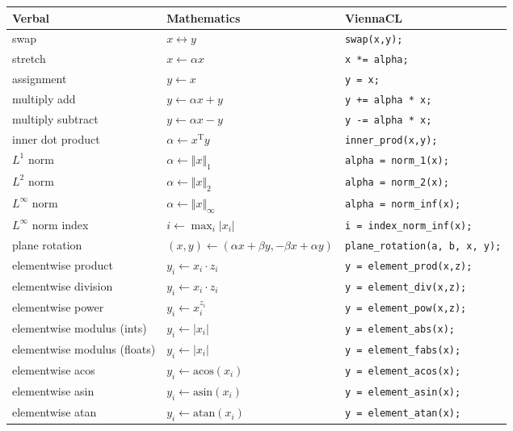 \begin{table}[tb]
\begin{center}
\begin{tabular}{l|l|p{6cm}}
Verbal & Mathematics & ViennaCL\\
\hline
swap    & $x \leftrightarrow y$ & \lstinline|swap(x,y);| \\
stretch    & $x \leftarrow \alpha x$ & \lstinline|x *= alpha;| \\
assignment & $y \leftarrow x$ & \lstinline|y = x;| \\
multiply add & $y \leftarrow \alpha x + y$ & \lstinline|y += alpha * x;| \\
multiply subtract & $y \leftarrow \alpha x - y$ & \lstinline|y -= alpha * x;| \\
inner dot product & $\alpha \leftarrow x^{\mathrm{T}} y$ & \lstinline|inner_prod(x,y);| \\
$L^1$ norm & $\alpha \leftarrow \Vert x \Vert_1$ & \lstinline|alpha = norm_1(x);| \\
$L^2$ norm & $\alpha \leftarrow \Vert x \Vert_2$ & \lstinline|alpha = norm_2(x);| \\
$L^\infty$ norm & $\alpha \leftarrow \Vert x \Vert_\infty$ & \lstinline|alpha = norm_inf(x);| \\
$L^\infty$ norm index& $i \leftarrow \max_i \vert x_i \vert$ & \lstinline|i = index_norm_inf(x);| \\
plane rotation & $(x,y) \leftarrow (\alpha x + \beta y, -\beta x + \alpha y)$ & \lstinline|plane_rotation(a, b, x, y);| \\
\hline
elementwise product  & $y_i \leftarrow x_i \cdot z_i$ & \lstinline|y = element_prod(x,z);| \\
elementwise division & $y_i \leftarrow x_i \cdot z_i$ & \lstinline|y = element_div(x,z);| \\
elementwise power    & $y_i \leftarrow x_i^{z_i}$ & \lstinline|y = element_pow(x,z);| \\
\hline
elementwise modulus (ints)   & $y_i \leftarrow |x_i|$ & \lstinline|y = element_abs(x);| \\
elementwise modulus (floats) & $y_i \leftarrow |x_i|$ & \lstinline|y = element_fabs(x);| \\
elementwise acos  & $y_i \leftarrow \textrm{acos}(x_i)$ & \lstinline|y = element_acos(x);| \\
elementwise asin  & $y_i \leftarrow \textrm{asin}(x_i)$ & \lstinline|y = element_asin(x);| \\
elementwise atan  & $y_i \leftarrow \textrm{atan}(x_i)$ & \lstinline|y = element_atan(x);| \\

\end{tabular}
\end{center}
\end{table}
